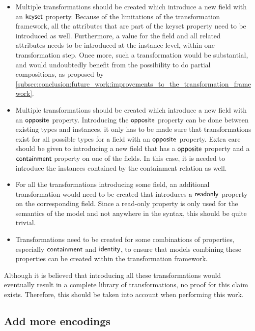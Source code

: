 \begin{itemize}
    \item Multiple transformations should be created which introduce a new field with an $\mathsf{keyset}$ property. Because of the limitations of the transformation framework, all the attributes that are part of the keyset property need to be introduced as well. Furthermore, a value for the field and all related attributes needs to be introduced at the instance level, within one transformation step. Once more, such a transformation would be substantial, and would undoubtedly benefit from the possibility to do partial compositions, as proposed by \cref{subsec:conclusion:future_work:improvements_to_the_transformation_framework}.
    
    \item Multiple transformations should be created which introduce a new field with an $\mathsf{opposite}$ property. Introducing the $\mathsf{opposite}$ property can be done between existing types and instances, it only has to be made sure that transformations exist for all possible types for a field with an $\mathsf{opposite}$ property. Extra care should be given to introducing a new field that has a $\mathsf{opposite}$ property and a $\mathsf{containment}$ property on one of the fields. In this case, it is needed to introduce the instances contained by the containment relation as well.
    
    \item For all the transformations introducing some field, an additional transformation would need to be created that introduces a $\mathsf{readonly}$ property on the corresponding field. Since a read-only property is only used for the semantics of the model and not anywhere in the syntax, this should be quite trivial.
    
    \item Transformations need to be created for some combinations of properties, especially $\mathsf{containment}$ and $\mathsf{identity}$, to ensure that models combining these properties can be created within the transformation framework.
\end{itemize}
Although it is believed that introducing all these transformations would eventually result in a complete library of transformations, no proof for this claim exists. Therefore, this should be taken into account when performing this work.


\subsection{Add more encodings}
\label{subsec:conclusion:future_work:add_more_encodings}

